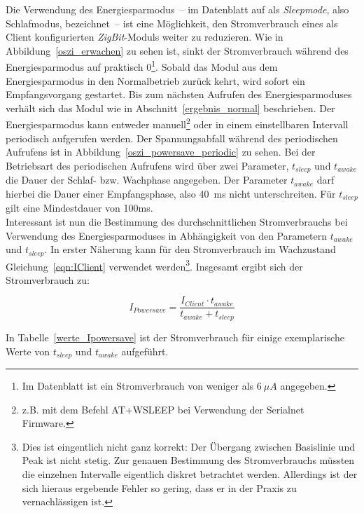 Die Verwendung des Energiesparmodus~-- im Datenblatt auf als \emph{Sleepmode}, also Schlafmodus, bezeichnet~-- ist eine
Möglichkeit, den Stromverbrauch eines als Client konfigurierten \emph{ZigBit}-Moduls weiter zu reduzieren. Wie in 
Abbildung~\ref{oszi_erwachen} zu sehen ist, sinkt der Stromverbrauch während des Energiesparmodus auf praktisch 
0\footnote{Im Datenblatt ist ein Stromverbrauch von weniger als $6~\mu{}A$ angegeben.}. Sobald das Modul aus dem 
Energiesparmodus in den Normalbetrieb zurück kehrt, wird sofort ein Empfangsvorgang gestartet. Bis zum nächsten Aufrufen des 
Energiesparmoduses verhält sich das Modul wie in Abschnitt~\ref{ergebnis_normal} beschrieben. Der Energiesparmodus kann
entweder manuell\footnote{z.B. mit dem Befehl AT+WSLEEP bei Verwendung der Serialnet Firmware.} oder in einem 
einstellbaren Intervall periodisch aufgerufen werden. Der Spannungsabfall während des periodischen Aufrufens ist in
Abbildung~\ref{oszi_powersave_periodic} zu sehen. Bei der Betriebsart des periodischen Aufrufens wird über zwei Parameter,
$t_{sleep}$ und $t_{awake}$ die Dauer der Schlaf- bzw. Wachphase angegeben. Der Parameter $t_{awake}$ darf hierbei die Dauer
einer Empfangsphase, also 40~ms nicht unterschreiten. Für $t_{sleep}$ gilt eine Mindestdauer von 100ms.\\
Interessant ist nun die Bestimmung des durchschnittlichen Stromverbrauchs bei Verwendung des Energiesparmoduses
in Abhängigkeit von den Parametern $t_{awake}$ und $t_{sleep}$. In erster Näherung kann für den Stromverbrauch im Wachzustand
Gleichung~\ref{eqn:IClient} verwendet werden\footnote{Dies ist eingentlich nicht ganz korrekt: Der Übergang zwischen 
Basislinie und Peak ist nicht stetig. Zur genauen Bestimmung des Stromverbrauchs müssten die einzelnen Intervalle eigentlich
diskret betrachtet werden. Allerdings ist der sich hieraus ergebende Fehler so gering, dass er in der Praxis zu 
vernachlässigen ist.}. Insgesamt ergibt sich der Stromverbrauch zu:

\begin{equation}
   I_{Powersave} = \frac{I_{Client} \cdot t_{awake}}{t_{awake} + t_{sleep}}
\end{equation}

In Tabelle~\ref{werte_Ipowersave} ist der Stromverbrauch für einige exemplarische Werte von $t_{sleep}$ und $t_{awake}$ 
aufgeführt.


